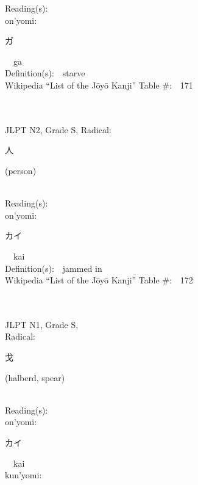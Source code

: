 \begin{multicols}{2}
Reading(s):\ \ \\
{\hspace*{1em}}on'yomi:\ \ \\
{\hspace*{2em}}{\begin{CJK}{UTF8}{min} ガ \end{CJK}}\ \ ga\ \ \\
Definition(s):\ \ starve \\
Wikipedia ``List of the J\=oy\=o Kanji'' Table \#:\ \ 171 \\
\ \ \\
{\fontsize{34pt}{40pt}  }\ \ \\  %
{JLPT N2, Grade S, Radical:\ \ {\begin{CJK}{UTF8}{min} 人 \end{CJK}} (person) } \\
Reading(s):\ \ \\
{\hspace*{1em}}on'yomi:\ \ \\
{\hspace*{2em}}{\begin{CJK}{UTF8}{min} カイ \end{CJK}}\ \ kai\ \ \\
Definition(s):\ \ jammed in \\
Wikipedia ``List of the J\=oy\=o Kanji'' Table \#:\ \ 172 \\
\ \ \\
{\fontsize{34pt}{40pt}  }\ \ \\
{JLPT N1, Grade S, \\Radical:\ \ {\begin{CJK}{UTF8}{min} 戈 \end{CJK}} (halberd, spear) } \\
Reading(s):\ \ \\
{\hspace*{1em}}on'yomi:\ \ \\
{\hspace*{2em}}{\begin{CJK}{UTF8}{min} カイ \end{CJK}}\ \ kai\ \ \\
{\hspace*{1em}}kun'yomi:\ \ \\

\end{multicols}
